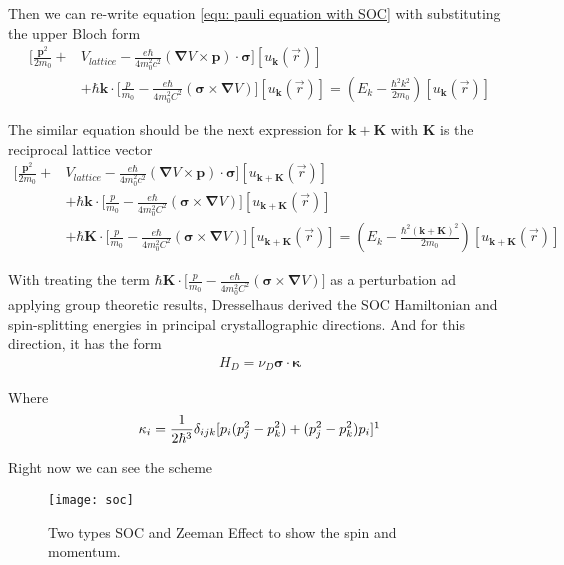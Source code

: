 Then we can re-write equation \ref{equ: pauli equation with SOC} with substituting the upper Bloch form
\begin{align*}
	\Big[\frac{\pmb{p}^2}{2m_0}+&V_{lattice}-\frac{e\hbar}{4m_0^2c^2}(\pmb{\nabla}V\times\pmb{p})\cdot\pmb{\sigma} \Big][u_{\pmb{k}}(\vec{r})]\\
	&+\hbar\pmb{k}\cdot\Big[\frac{p}{m_0}-\frac{e\hbar}{4m_0^2C^2}(\pmb{\sigma}\times\pmb{\nabla}V) \Big][u_{\pmb{k}}(\vec{r})]=(E_k-\frac{\hbar^2k^2}{2m_0})[u_{\pmb{k}}(\vec{r})]
\end{align*}


The similar equation should be the next expression for $\pmb{k}+\pmb{K}$ with $\pmb{K}$ is the reciprocal lattice vector
\begin{align*}
	\Big[\frac{\pmb{p}^2}{2m_0}+&V_{lattice}-\frac{e\hbar}{4m_0^2c^2}(\pmb{\nabla}V\times\pmb{p})\cdot\pmb{\sigma} \Big][u_{\pmb{k}+\pmb{K}}(\vec{r})]\\
	&+\hbar\pmb{k}\cdot\Big[\frac{p}{m_0}-\frac{e\hbar}{4m_0^2C^2}(\pmb{\sigma}\times\pmb{\nabla}V) \Big][u_{\pmb{k}+\pmb{K}}
	(\vec{r})]\\
	&+\hbar\pmb{K}\cdot\Big[\frac{p}{m_0}-\frac{e\hbar}{4m_0^2C^2}(\pmb{\sigma}\times\pmb{\nabla}V) \Big][u_{\pmb{k}+\pmb{K}}
	(\vec{r})]=(E_k-\frac{\hbar^2(\pmb{k}+\pmb{K})^2}{2m_0})[u_{\pmb{k}+\pmb{K}}(\vec{r})]
\end{align*}
 
 With treating the term $\hbar\pmb{K}\cdot\Big[\frac{p}{m_0}-\frac{e\hbar}{4m_0^2C^2}(\pmb{\sigma}\times\pmb{\nabla}V) \Big]$ as a perturbation ad applying group theoretic results, Dresselhaus derived the SOC Hamiltonian and spin-splitting energies in principal crystallographic directions. And for this direction, it has the form
 \begin{align}
 	H_D=\nu_D \pmb{\sigma}\cdot \pmb{\kappa}
 	\label{equ: dresselhaus type SOC hamiltonian}
 \end{align}
 
 Where 
 \begin{gather*}
 	\kappa_i=\frac{1}{2\hbar^3}\delta_{ijk}[p_i(p_j^2-p_k^2)+(p_j^2-p_k^2)p_i] \footnotemark[1]
 \end{gather*}
 
 
 
 
 Right now we can see the scheme 
 \begin{figure}[H]
 	\centering	
 	\texttt{[image: soc]}
 	\caption{Two types SOC and Zeeman Effect to show the spin and momentum.}
 	\label{fig: rashba effect and dresselhaus effect's scheme}
 \end{figure}
 
